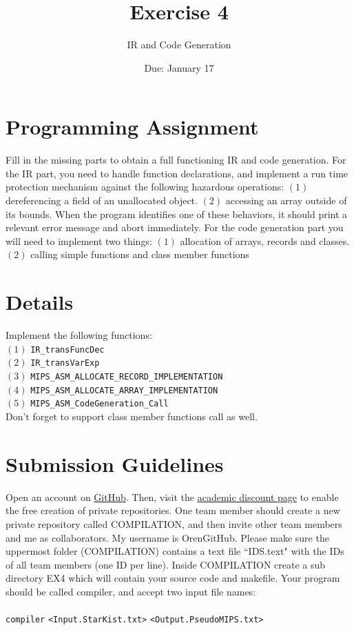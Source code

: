 \documentclass{article}
\title{Exercise 4}
\author{IR and Code Generation}
\date{Due: January 17}
\begin{document}
\maketitle
\section*{Programming Assignment}
Fill in the missing parts to obtain a full functioning IR and code generation.
For the IR part, you need to handle function declarations,
and implement a run time protection mechanism against the following hazardous operations:
$(1)$ dereferencing a field of an unallocated object.
$(2)$ accessing an array outside of its bounds.
When the program identifies one of these behaviors, it should print a relevant error message and abort immediately.
For the code generation part you will need to implement two things:
$(1)$ allocation of arrays, records and classes.
$(2)$ calling simple functions and class member functions

\section*{Details}
Implement the following functions:\\
$(1)$ \verb"IR_transFuncDec" \\
$(2)$ \verb"IR_transVarExp" \\
$(3)$ \verb"MIPS_ASM_ALLOCATE_RECORD_IMPLEMENTATION"\\
$(4)$ \verb"MIPS_ASM_ALLOCATE_ARRAY_IMPLEMENTATION"\\
$(5)$ \verb"MIPS_ASM_CodeGeneration_Call"\\
Don't forget to support class member functions call as well.

\section*{Submission Guidelines}
Open an account on \href{https://github.com/}{GitHub}.
Then, visit the
\href{https://education.github.com/discount_requests/new}{academic discount page}
to enable the free creation of private repositories.
One team member should create a new private repository called COMPILATION,
and then invite other team members and me as collaborators.
My username is OrenGitHub.
Please make sure the uppermost folder (COMPILATION) contains a text file ``IDS.text" with the IDs of all team members (one ID per line).
Inside COMPILATION create a sub directory EX4 which will contain your source code and makefile.
Your program should be called compiler, and accept two input file names:\\ \\
\verb"compiler" \verb"<Input.StarKist.txt>" \verb"<Output.PseudoMIPS.txt>"
\end{document}
